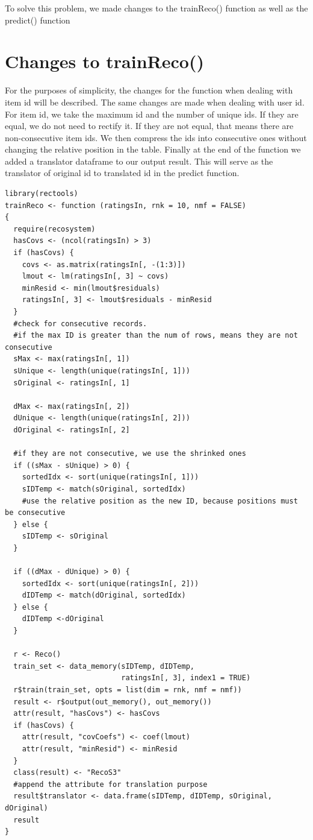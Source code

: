 \documentclass{article}
\begin{document}
To solve this problem, we made changes to the trainReco() function as well as the predict() function

\section{Changes to trainReco()}

For the purposes of simplicity, the changes for the function when dealing with item id will be described.  The same changes are made when dealing with user id. For item id, we take the maximum id and the number of unique ids. If they are equal, we do not need to rectify it. If they are not equal, that means there are non-consecutive item ids. We then compress the ids into consecutive ones without changing the relative position in the table. Finally at the end of the function we added a translator dataframe to our output result. This will serve as the translator of original id to translated id in the predict function. 

\begin{verbatim}
library(rectools)
trainReco <- function (ratingsIn, rnk = 10, nmf = FALSE) 
{
  require(recosystem)
  hasCovs <- (ncol(ratingsIn) > 3)
  if (hasCovs) {
    covs <- as.matrix(ratingsIn[, -(1:3)])
    lmout <- lm(ratingsIn[, 3] ~ covs)
    minResid <- min(lmout$residuals)
    ratingsIn[, 3] <- lmout$residuals - minResid
  }
  #check for consecutive records.
  #if the max ID is greater than the num of rows, means they are not consecutive
  sMax <- max(ratingsIn[, 1])
  sUnique <- length(unique(ratingsIn[, 1]))
  sOriginal <- ratingsIn[, 1]
  
  dMax <- max(ratingsIn[, 2])
  dUnique <- length(unique(ratingsIn[, 2]))
  dOriginal <- ratingsIn[, 2]
  
  #if they are not consecutive, we use the shrinked ones
  if ((sMax - sUnique) > 0) {
    sortedIdx <- sort(unique(ratingsIn[, 1]))
    sIDTemp <- match(sOriginal, sortedIdx)
    #use the relative position as the new ID, because positions must be consecutive
  } else {
    sIDTemp <- sOriginal
  }
  
  if ((dMax - dUnique) > 0) {
    sortedIdx <- sort(unique(ratingsIn[, 2]))
    dIDTemp <- match(dOriginal, sortedIdx)
  } else {
    dIDTemp <-dOriginal
  }
  
  r <- Reco()
  train_set <- data_memory(sIDTemp, dIDTemp, 
                           ratingsIn[, 3], index1 = TRUE)
  r$train(train_set, opts = list(dim = rnk, nmf = nmf))
  result <- r$output(out_memory(), out_memory())
  attr(result, "hasCovs") <- hasCovs
  if (hasCovs) {
    attr(result, "covCoefs") <- coef(lmout)
    attr(result, "minResid") <- minResid
  }
  class(result) <- "RecoS3"
  #append the attribute for translation purpose
  result$translator <- data.frame(sIDTemp, dIDTemp, sOriginal, dOriginal)
  result
}
\end{verbatim}
\end{document}
